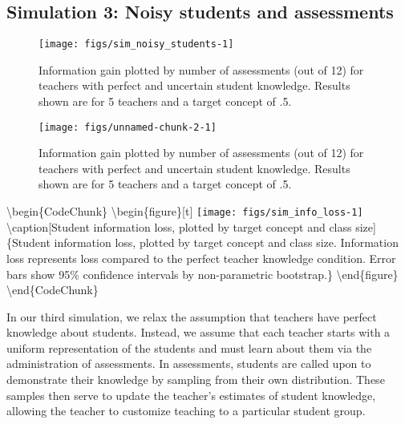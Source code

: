 \documentclass[10pt, letterpaper]{article}
\newenvironment{CodeChunk}{}{}
\begin{document}
\subsection{Simulation 3: Noisy students and
assessments}\label{simulation-3-noisy-students-and-assessments}

\begin{CodeChunk}
\begin{figure*}[t]
\texttt{[image: figs/sim\_noisy\_students-1]} \caption[Information gain plotted by number of assessments (out of 12) for teachers with perfect and uncertain student knowledge]{Information gain plotted by number of assessments (out of 12) for teachers with perfect and uncertain student knowledge. Results shown are for 5 teachers and a target concept of .5.}\label{fig:sim_noisy_students}
\end{figure*}
\end{CodeChunk}

\begin{CodeChunk}
\begin{figure}[t]
\texttt{[image: figs/unnamed-chunk-2-1]} \caption[Information gain plotted by number of assessments (out of 12) for teachers with perfect and uncertain student knowledge]{Information gain plotted by number of assessments (out of 12) for teachers with perfect and uncertain student knowledge. Results shown are for 5 teachers and a target concept of .5.}\label{fig:unnamed-chunk-2}
\end{figure}
\end{CodeChunk}

\textbackslash{}begin\{CodeChunk\}
\textbackslash{}begin\{figure\}{[}t{]}
\texttt{[image: figs/sim\_info\_loss-1]}
\textbackslash{}caption{[}Student information loss, plotted by target
concept and class size{]}\{Student information loss, plotted by target
concept and class size. Information loss represents loss compared to the
perfect teacher knowledge condition. Error bars show 95\% confidence
intervals by non-parametric bootstrap.\}\label{fig:sim_info_loss}
\textbackslash{}end\{figure\} \textbackslash{}end\{CodeChunk\}

In our third simulation, we relax the assumption that teachers have
perfect knowledge about students. Instead, we assume that each teacher
starts with a uniform representation of the students and must learn
about them via the administration of assessments. In assessments,
students are called upon to demonstrate their knowledge by sampling from
their own distribution. These samples then serve to update the teacher's
estimates of student knowledge, allowing the teacher to customize
teaching to a particular student group.
\end{document}
